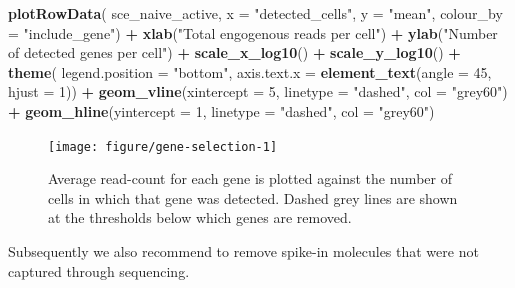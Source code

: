 \documentclass[9pt,a4paper,]{extarticle}
\newenvironment{Shaded}{\begin{snugshade}}{\end{snugshade}}
\newcommand{\CommentTok}[1]{\textcolor[rgb]{0.56,0.35,0.01}{\textit{#1}}}
\newcommand{\DataTypeTok}[1]{\textcolor[rgb]{0.13,0.29,0.53}{#1}}
\newcommand{\DecValTok}[1]{\textcolor[rgb]{0.00,0.00,0.81}{#1}}
\newcommand{\KeywordTok}[1]{\textcolor[rgb]{0.13,0.29,0.53}{\textbf{#1}}}
\newcommand{\NormalTok}[1]{#1}
\newcommand{\OperatorTok}[1]{\textcolor[rgb]{0.81,0.36,0.00}{\textbf{#1}}}
\newcommand{\StringTok}[1]{\textcolor[rgb]{0.31,0.60,0.02}{#1}}
\begin{document}
\begin{Shaded}
\begin{Highlighting}[]
\KeywordTok{plotRowData}\NormalTok{(}
\NormalTok{    sce_naive_active,}
    \DataTypeTok{x =} \StringTok{"detected_cells"}\NormalTok{,}
    \DataTypeTok{y =} \StringTok{"mean"}\NormalTok{,}
    \DataTypeTok{colour_by =} \StringTok{"include_gene"}\NormalTok{) }\OperatorTok{+}
\StringTok{  }\KeywordTok{xlab}\NormalTok{(}\StringTok{"Total engogenous reads per cell"}\NormalTok{) }\OperatorTok{+}
\StringTok{  }\KeywordTok{ylab}\NormalTok{(}\StringTok{"Number of detected genes per cell"}\NormalTok{) }\OperatorTok{+}
\StringTok{  }\KeywordTok{scale_x_log10}\NormalTok{() }\OperatorTok{+}
\StringTok{  }\KeywordTok{scale_y_log10}\NormalTok{() }\OperatorTok{+}
\StringTok{  }\KeywordTok{theme}\NormalTok{(}
    \DataTypeTok{legend.position =} \StringTok{"bottom"}\NormalTok{,}
    \DataTypeTok{axis.text.x =} \KeywordTok{element_text}\NormalTok{(}\DataTypeTok{angle =} \DecValTok{45}\NormalTok{, }\DataTypeTok{hjust =} \DecValTok{1}\NormalTok{)) }\OperatorTok{+}
\KeywordTok{geom_vline}\NormalTok{(}\DataTypeTok{xintercept =} \DecValTok{5}\NormalTok{, }\DataTypeTok{linetype =} \StringTok{"dashed"}\NormalTok{, }\DataTypeTok{col =} \StringTok{"grey60"}\NormalTok{) }\OperatorTok{+}
\KeywordTok{geom_hline}\NormalTok{(}\DataTypeTok{yintercept =} \DecValTok{1}\NormalTok{, }\DataTypeTok{linetype =} \StringTok{"dashed"}\NormalTok{, }\DataTypeTok{col =} \StringTok{"grey60"}\NormalTok{)}
\end{Highlighting}
\end{Shaded}

\begin{figure}

{\centering \texttt{[image: figure/gene-selection-1]} 

}

\caption{Average read-count for each gene is plotted against the number of cells in which that gene was detected. Dashed grey lines are shown at the thresholds below which genes are removed.}\label{fig:gene-selection}
\end{figure}

\begin{Shaded}
\end{Shaded}

Subsequently we also recommend to remove spike-in molecules that were not
captured through sequencing.
\end{document}
